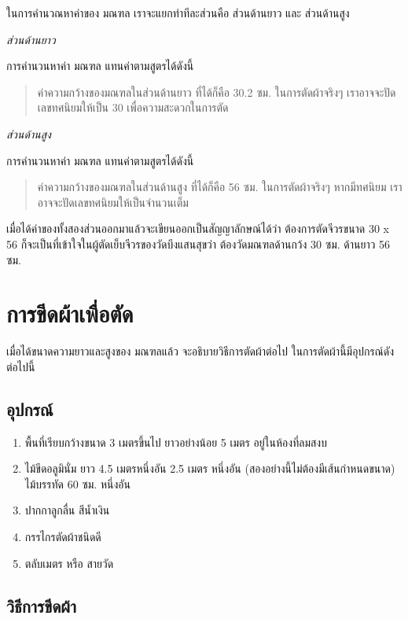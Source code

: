 ในการคำนวณหาค่าของ มณฑล เราจะแยกทำทีละส่วนคือ ส่วนด้านยาว และ
ส่วนด้านสูง

\emph{ส่วนด้านยาว}

การคำนวนหาค่า มณฑล แทนค่าตามสูตรได้ดังนี้

\begin{quote}
ค่าความกว้างของมณฑลในส่วนด้านยาว ที่ได้ก็คือ 30.2 ซม. ในการตัดผ้าจริงๆ
เราอาจจะปัดเลขทศนิยมให้เป็น 30 เพื่อความสะดวกในการตัด
\end{quote}

\emph{ส่วนด้านสูง}

การคำนวนหาค่า มณฑล แทนค่าตามสูตรได้ดังนี้

\begin{quote}
ค่าความกว้างของมณฑลในส่วนด้านสูง ที่ได้ก็คือ 56 ซม. ในการตัดผ้าจริงๆ
หากมีทศนิยม เราอาจจะปัดเลขทศนิยมให้เป็นจำนวนเต็ม
\end{quote}

เมื่อได้ค่าของทั้งสองส่วนออกมาแล้วจะเขียนออกเป็นสัญญาลักษณ์ได้ว่า
ต้องการตัดจีวรขนาด 30 x 56
ก็จะเป็นที่เข้าใจในผู้ตัดเย็บจีวรของวัดบึงแสนสุขว่า ต้องวัดมณฑลด้านกว้ง
30 ซม. ด้านยาว 56 ซม.

\section{การขีดผ้าเพื่อตัด}

เมื่อได้ขนาดความยาวและสูงของ มณฑลแล้ว จะอธิบายวิธีการตัดผ้าต่อไป
ในการตัดผ้านี้มีอุปกรณ์ดังต่อไปนี้

\subsection{อุปกรณ์}

\begin{enumerate}
\def\labelenumi{(\arabic{enumi})}
\item
  พื้นที่เรียบกว้างขนาด 3 เมตรขึ้นไป ยาวอย่างน้อย 5 เมตร
  อยู่ในห้องที่ลมสงบ
\item
  ไม้ขีดอลูมินั่ม ยาว 4.5 เมตรหนึ่งอัน 2.5 เมตร หนึ่งอัน
  (สองอย่างนี้ไม่ต้องมีเส้นกำหนดขนาด) ไม้บรรทัด 60 ซม. หนึ่งอัน
\item
  ปากกาลูกลื่น สีน้ำเงิน
\item
  กรรไกรตัดผ้าชนิดดี
\item
  ตลับเมตร หรือ สายวัด
\end{enumerate}

\subsection{วิธีการขีดผ้า}

